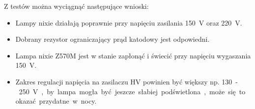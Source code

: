 \documentclass[../main.tex]{subfiles}
\begin{document}
Z testów można wyciągnąć następujące wnioski:

\begin{itemize}
    \item Lampy nixie działają poprawnie przy napięciu zasilania \SI{150}{\volt} oraz \SI{220}{\volt}.
    \item Dobrany rezystor ograniczający prąd katodowy jest odpowiedni.
    \item Lampa nixie Z570M jest w stanie zapłonąć i świecić przy napięciu wygaszania \SI{150}{\volt}.
    \item Zakres regulacji napięcia na zasilaczu HV powinien być większy np. \SI{130}-\SI{250}{\volt}, by lampa mogła być jeszcze słabiej podświetlona, może się to okazać przydatne w nocy.
\end{itemize}
\end{document}
